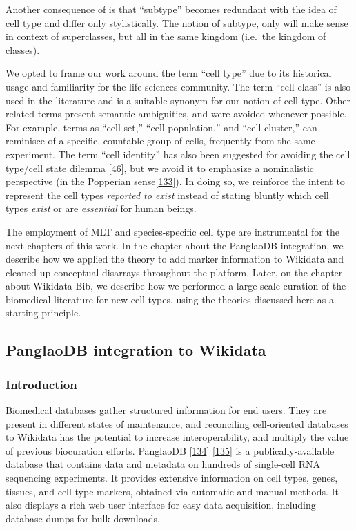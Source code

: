 Another consequence of is that ``subtype'' becomes redundant with the idea of cell type and differ only stylistically.
The notion of subtype, only will make sense in context of superclasses, but all in the same kingdom (i.e.~the kingdom of classes).

We opted to frame our work around the term ``cell type'' due to its historical usage and familiarity for the life sciences community.
The term ``cell class'' is also used in the literature and is a suitable synonym for our notion of cell type.
Other related terms present semantic ambiguities, and were avoided whenever possible.
For example, terms as ``cell set,'' ``cell population,'' and ``cell cluster,'' can reminisce of a specific, countable group of cells, frequently from the same experiment.
The term ``cell identity'' has also been suggested for avoiding the cell type/cell state dilemma {[}\protect\hyperlink{ref-WKbly37M}{46}{]}, but we avoid it to emphasize a nominalistic perspective (in the Popperian sense{[}\protect\hyperlink{ref-1C6LI68h6}{133}{]}).
In doing so, we reinforce the intent to represent the cell types \emph{reported to exist} instead of stating bluntly which cell types \emph{exist} or are \emph{essential} for human beings.

The employment of MLT and species-specific cell type are instrumental for the next chapters of this work.
In the chapter about the PanglaoDB integration, we describe how we applied the theory to add marker information to Wikidata and cleaned up conceptual disarrays throughout the platform.
Later, on the chapter about Wikidata Bib, we describe how we performed a large-scale curation of the biomedical literature for new cell types, using the theories discussed here as a starting principle.

\hypertarget{panglaodb-integration-to-wikidata}{%
\subsection{PanglaoDB integration to Wikidata}\label{panglaodb-integration-to-wikidata}}

\hypertarget{introduction}{%
\subsubsection{Introduction}\label{introduction}}

Biomedical databases gather structured information for end users.
They are present in different states of maintenance, and reconciling cell-oriented databases to Wikidata has the potential to increase interoperability, and multiply the value of previous biocuration efforts.
PanglaoDB {[}\protect\hyperlink{ref-M0lqRYJb}{134}{]} {[}\protect\hyperlink{ref-T3PlZ3Vh}{135}{]} is a publically-available database that contains data and metadata on hundreds of single-cell RNA sequencing experiments.
It provides extensive information on cell types, genes, tissues, and cell type markers, obtained via automatic and manual methods.
It also displays a rich web user interface for easy data acquisition, including database dumps for bulk downloads.

